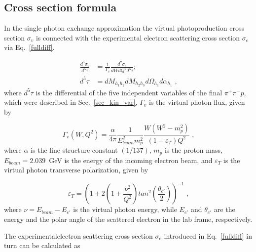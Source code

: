 \documentclass[prc,twocolumn,superscriptaddress,showpacs,amssymb,amsmath,amsfonts,linenumbers,aps]{revtex4-1}
\begin{document}
\subsection{Cross section formula}
\label{cr_sect_formula}


In the single photon exchange approximation the virtual photoproduction cross section $\sigma_{v}$ is connected with the experimental electron scattering cross section $\sigma_{e}$ via Eq.~\eqref{fulldiff}. 

\begin{equation}
\begin{aligned}
\frac{d^{5}\sigma_{v}}{d^{5}\tau} & = \frac{1}{\Gamma_{v}}
\frac{d^{7}\sigma_{e}}{dWdQ^{2}d^{5}\tau}; \\
d^{5}\tau & = dM_{h_{1}h_{2}}dM_{h_{2}h_{3}}d\Omega_{h_{1}}
d\alpha_{h_{1}} \textrm{ ,}
\label{fulldiff}
\end {aligned}
\end{equation}
where $d^{5}\tau$ is the differential of the five independent variables of the final $\pi^{+}\pi^{-}p$, which were described in Sec.~\ref{sec_kin_var}, $\Gamma_{v}$ is the 
virtual photon flux, given by

\begin{equation}
\Gamma_{v}(W,Q^{2}) =
\frac{\alpha}{4\pi}\frac{1}{E_{beam}^{2}m_{p}^{2}}\frac{W(W^{2}-m_{p}^{2})}
{(1-\varepsilon_{T})Q^{2}} \textrm{ ,}
\label{flux}
\end{equation}
where $\alpha$ is the fine structure constant $\left(1/137\right)$, $m_{p}$ is the proton
mass, $E_{beam} = 2.039$~GeV is the energy of the incoming electron beam, and $\varepsilon_{T}$ is the virtual photon transverse polarization, given by

\begin{equation}
\varepsilon_{T} = \left( 1 + 2\left( 1 +
\frac{\nu^{2}}{Q^{2}} \right)
tan^{2}\left(\frac{\theta_{e'}}{2}\right) \right)^{-1} \textrm{ ,}
\label{polarization}
\end{equation}
where $\nu = E_{beam} - E_{e'}$ is the virtual photon energy, while $E_{e'}$ and
$\theta_{e'}$ are the energy and the polar angle of the scattered electron in the
lab frame, respectively. 

The experimentalelectron scattering cross section $\sigma_{e}$ introduced in Eq.~\eqref{fulldiff} in turn can be calculated as
  
\end{document}
